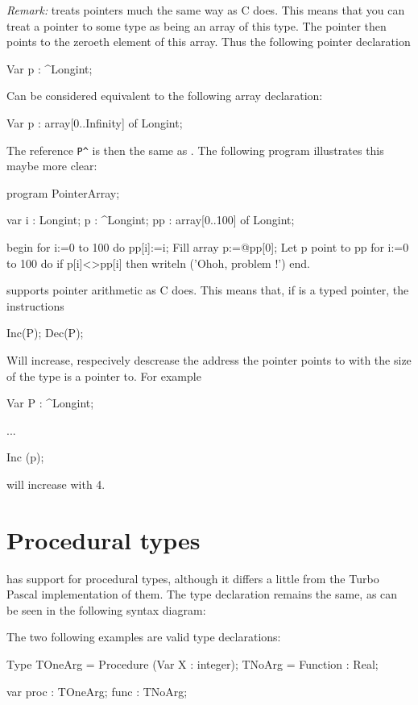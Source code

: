 \documentclass{report}
\begin{document}
{\em Remark:} \fpc treats pointers much the same way as C does. This means
that you can treat a pointer to some type as being an array of this type.  
The pointer then points to the zeroeth element of this array. Thus the
following pointer declaration 
\begin{listing}
Var p : ^Longint;
\end{listing}
Can be considered equivalent to the following array declaration:
\begin{listing}
Var p : array[0..Infinity] of Longint;
\end{listing}
The reference \verb+P^+ is then the same as . The following program
illustrates this maybe more clear:
\begin{listing}
program PointerArray;

var i : Longint;
    p : ^Longint;
    pp : array[0..100] of Longint;  

begin
  for i:=0 to 100 do pp[i]:=i; { Fill array }
  p:=@pp[0];                   { Let p point to pp }
  for i:=0 to 100 do if p[i]<>pp[i] then writeln ('Ohoh, problem !')
end.
\end{listing}
\fpc supports pointer arithmetic as C does. This means that, if  is a
typed pointer, the instructions
\begin{listing}
Inc(P);
Dec(P);
\end{listing}
Will increase, respecively descrease the address the pointer points to
with the size of the type  is a pointer to. For example
\begin{listing}
Var P : ^Longint;

...

 Inc (p);
\end{listing}
will increase  with 4.

\section{Procedural types}
\fpc has support for procedural types, although it differs a little from 
the Turbo Pascal implementation of them. The type declaration remains the
same, as can be seen in the following syntax diagram:



The two following examples are valid type declarations:
\begin{listing}
Type TOneArg = Procedure (Var X : integer);
     TNoArg = Function : Real;

var proc : TOneArg;
    func : TNoArg;
\end{listing}
\end{document}

